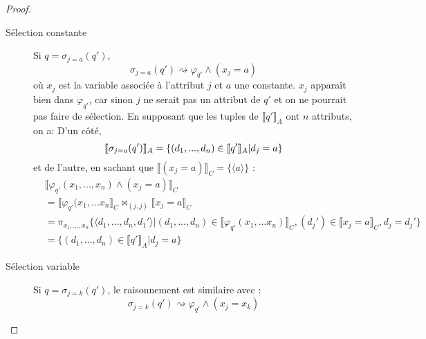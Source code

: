 \begin{proof}
\begin{description}
\item[Sélection constante] Si $q=\sigma_{j=a}(q')$,
$$
\sigma_{j=a}(q') \rightsquigarrow \varphi_{q'} \wedge (x_j=a)
$$ 
où $x_j$ est la variable associée à l'attribut $j$ et $a$ une constante. $x_j$ apparaît bien dans $\varphi_{q'}$, car sinon $j$ ne serait pas un attribut de $q'$ et on ne pourrait pas faire de sélection. En supposant que les tuples de $\llbracket q' \rrbracket_A$ ont $n$ attributs, on a:
D'un côté,
$$
\llbracket \sigma_{j=a}(q') \rrbracket_A = \{(d_1,...,d_n)\in \llbracket q' \rrbracket_A | d_j= a \} \\
$$ 
et de l'autre, en sachant que $\llbracket (x_j=a) \rrbracket_C =\{\langle a \rangle\}$ :
\begin{align*}
&\llbracket \varphi_{q'}(x_1,...,x_n) \wedge (x_j=a) \rrbracket_C \\
&= 
\llbracket \varphi_{q'}(x_1,...x_n \rrbracket_C \Join_{(j,j)} \llbracket x_j = a \rrbracket_C \\
&= \pi_{x_1,...,x_n}\{ \langle d_1,...,d_n,d_1'\rangle | (d_1,...,d_n) \in \llbracket \varphi_{q'}(x_1,...x_n) \rrbracket_C, (d_j')\in \llbracket x_j = a \rrbracket_C , d_j=d_j'\} \\
&=  \{(d_1,...,d_n)\in \llbracket q' \rrbracket_A | d_j= a \}
\end{align*}

\item[Sélection variable] Si $q=\sigma_{j=k}(q')$, le raisonnement est similaire avec :
$$
\sigma_{j=k}(q') \rightsquigarrow \varphi_{q'} \wedge (x_j =x_k)
$$
\end{description}
\end{proof}
